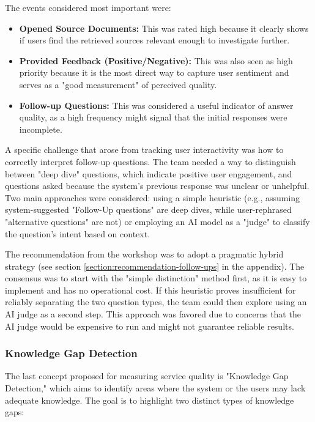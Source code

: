 \documentclass[
	english,
	ruledheaders=section,%
	class=report,%
	thesis={type=bachelor},%
	accentcolor=1b,%
	custommargins=true,%
	marginpar=false,%
	parskip=half-,%
	fontsize=11pt,%
	DIV=14,
]{tudapub}
\begin{document}
The events considered most important were:
\begin{itemize}
    \item \textbf{Opened Source Documents:} This was rated high because it clearly shows if users find the retrieved sources relevant enough to investigate further.
    \item \textbf{Provided Feedback (Positive/Negative):} This was also seen as high priority because it is the most direct way to capture user sentiment and serves as a "good measurement" of perceived quality.
    \item \textbf{Follow-up Questions:} This was considered a useful indicator of answer quality, as a high frequency might signal that the initial responses were incomplete.
\end{itemize}

A specific challenge that arose from tracking user interactivity was how to correctly interpret follow-up questions. The team needed a way to distinguish between "deep dive" questions, which indicate positive user engagement, and questions asked because the system's previous response was unclear or unhelpful. Two main approaches were considered: using a simple heuristic (e.g., assuming system-suggested "Follow-Up questions" are deep dives, while user-rephrased "alternative questions" are not) or employing an AI model as a "judge" to classify the question's intent based on context.

The recommendation from the workshop was to adopt a pragmatic hybrid strategy (see section \ref{section:recommendation-follow-ups} in the appendix). The consensus was to start with the "simple distinction" method first, as it is easy to implement and has no operational cost. If this heuristic proves insufficient for reliably separating the two question types, the team could then explore using an AI judge as a second step. This approach was favored due to concerns that the AI judge would be expensive to run and might not guarantee reliable results.

\subsubsection{Knowledge Gap Detection}
The last concept proposed for measuring service quality \parencite[p.~18]{DeloneMcLean2003ISSuccessTenYearUpdate} is "Knowledge Gap Detection," which aims to identify areas where the system or the users may lack adequate knowledge. The goal is to highlight two distinct types of knowledge gaps:
\end{document}
